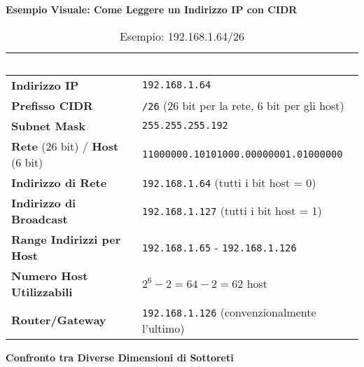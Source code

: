 \textbf{Esempio Visuale: Come Leggere un Indirizzo IP con CIDR}


\begin{table}[h]
\centering
\begin{tabular}{|l|l|}
\hline
\rowcolor{bg_custom}
\textcolor{white}{\textbf{Componente}} & \textcolor{white}{\textbf{Valore}} \\
\hline
\textbf{Indirizzo IP} & \texttt{192.168.1.64} \\
\hline
\textbf{Prefisso CIDR} & \texttt{/26} (26 bit per la rete, 6 bit per gli host) \\
\hline
\textbf{Subnet Mask} & \texttt{255.255.255.192} \\
\hline
\textcolor{retecolor}{\textbf{Rete} (26 bit)} / \textcolor{hostcolor}{\textbf{Host} (6 bit)} & \textcolor{retecolor}{\texttt{11000000.10101000.00000001.01}}\textcolor{hostcolor}{\texttt{000000}} \\
\hline
\textbf{Indirizzo di Rete} & \texttt{192.168.1.64} (tutti i bit host = 0) \\
\hline
\textbf{Indirizzo di Broadcast} & \texttt{192.168.1.127} (tutti i bit host = 1) \\
\hline
\textbf{Range Indirizzi per Host} & \texttt{192.168.1.65} - \texttt{192.168.1.126} \\
\hline
\textbf{Numero Host Utilizzabili} & $2^6 - 2 = 64 - 2 = 62$ host \\
\hline
\textbf{Router/Gateway} & \texttt{192.168.1.126} (convenzionalmente l'ultimo) \\
\hline
\end{tabular}
\caption{Esempio: 192.168.1.64/26}
\end{table}

\vspace{1em}

\textbf{Confronto tra Diverse Dimensioni di Sottoreti}

